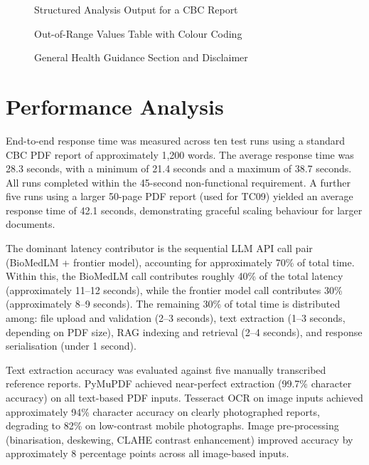 \begin{figure}[h]
    \centering
    \caption{Structured Analysis Output for a CBC Report}
\end{figure}

\begin{figure}[h]
    \centering
    \caption{Out-of-Range Values Table with Colour Coding}
\end{figure}

\begin{figure}[h]
    \centering
    \caption{General Health Guidance Section and Disclaimer}
\end{figure}

\section{Performance Analysis}
End-to-end response time was measured across ten test runs using a standard CBC PDF report of approximately 1,200 words. The average response time was 28.3 seconds, with a minimum of 21.4 seconds and a maximum of 38.7 seconds. All runs completed within the 45-second non-functional requirement. A further five runs using a larger 50-page PDF report (used for TC09) yielded an average response time of 42.1 seconds, demonstrating graceful scaling behaviour for larger documents.

The dominant latency contributor is the sequential LLM API call pair (BioMedLM + frontier model), accounting for approximately 70\% of total time. Within this, the BioMedLM call contributes roughly 40\% of the total latency (approximately 11--12 seconds), while the frontier model call contributes 30\% (approximately 8--9 seconds). The remaining 30\% of total time is distributed among: file upload and validation (2--3 seconds), text extraction (1--3 seconds, depending on PDF size), RAG indexing and retrieval (2--4 seconds), and response serialisation (under 1 second).

Text extraction accuracy was evaluated against five manually transcribed reference reports. PyMuPDF achieved near-perfect extraction (99.7\% character accuracy) on all text-based PDF inputs. Tesseract OCR on image inputs achieved approximately 94\% character accuracy on clearly photographed reports, degrading to 82\% on low-contrast mobile photographs. Image pre-processing (binarisation, deskewing, CLAHE contrast enhancement) improved accuracy by approximately 8 percentage points across all image-based inputs.


